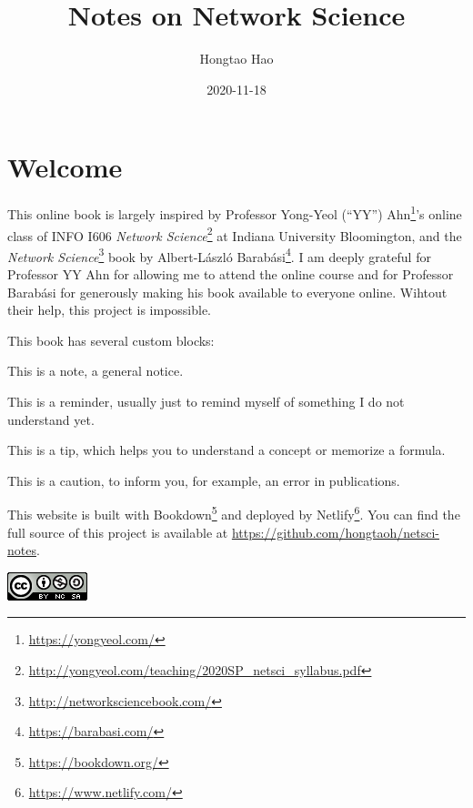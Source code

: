 \documentclass[
]{krantz}
\title{Notes on Network Science}
\author{Hongtao Hao}
\date{2020-11-18}
\makeatletter
\renewcommand{\href}[2]{#2\footnote{\url{#1}}}
\newenvironment{kframe}{%
\medskip{}
\setlength{\fboxsep}{.8em}
 \def\at@end@of@kframe{}%
 \ifinner\ifhmode%
  \def\at@end@of@kframe{\end{minipage}}%
  \begin{minipage}{\columnwidth}%
 \fi\fi%
 \def\FrameCommand##1{\hskip\@totalleftmargin \hskip-\fboxsep
 \colorbox{shadecolor}{##1}\hskip-\fboxsep
     \hskip-\linewidth \hskip-\@totalleftmargin \hskip\columnwidth}%
 \MakeFramed {\advance\hsize-\width
   \@totalleftmargin\z@ \linewidth\hsize
   \@setminipage}}%
 {\par\unskip\endMakeFramed%
 \at@end@of@kframe}
\newenvironment{rmdblock}[1]
  {
  \begin{itemize}
  \renewcommand{\labelitemi}{
    \raisebox{-.7\height}[0pt][0pt]{
      {\setkeys{Gin}{width=3em,keepaspectratio}\texttt{[image: images/\#1]}}
    }
  }
  \setlength{\fboxsep}{1em}
  \begin{kframe}
  \item
  }
  {
  \end{kframe}
  \end{itemize}
  }
\newenvironment{rmdnote}
  {\begin{rmdblock}{note}}
  {\end{rmdblock}}
\newenvironment{rmdcaution}
  {\begin{rmdblock}{caution}}
  {\end{rmdblock}}
\newenvironment{rmdtip}
  {\begin{rmdblock}{tip}}
  {\end{rmdblock}}
\newenvironment{rmdreminder}
  {\begin{rmdblock}{reminder}}
  {\end{rmdblock}}
\makeatother
\begin{document}
\maketitle

{
\hypersetup{linkcolor=}
\setcounter{tocdepth}{2}
\tableofcontents
}
\listoftables
\listoffigures
\hypertarget{welcome}{%
\chapter*{Welcome}\label{welcome}}


This online book is largely inspired by Professor \href{https://yongyeol.com/}{Yong-Yeol (``YY'') Ahn}'s online class of \href{http://yongyeol.com/teaching/2020SP_netsci_syllabus.pdf}{INFO I606 \emph{Network Science}} at Indiana University Bloomington, and the \href{http://networksciencebook.com/}{\emph{Network Science}} book by \href{https://barabasi.com/}{Albert-László Barabási}. I am deeply grateful for Professor YY Ahn for allowing me to attend the online course and for Professor Barabási for generously making his book available to everyone online. Wihtout their help, this project is impossible.

This book has several custom blocks:

\begin{rmdnote}
This is a note, a general notice.
\end{rmdnote}

\begin{rmdreminder}
This is a reminder, usually just to remind myself of something I do not understand yet.
\end{rmdreminder}

\begin{rmdtip}
This is a tip, which helps you to understand a concept or memorize a formula.
\end{rmdtip}

\begin{rmdcaution}
This is a caution, to inform you, for example, an error in publications.
\end{rmdcaution}

This website is built with \href{https://bookdown.org/}{Bookdown} and deployed by \href{https://www.netlify.com/}{Netlify}. You can find the full source of this project is available at \url{https://github.com/hongtaoh/netsci-notes}.

\includegraphics{images/license.png}
\end{document}
